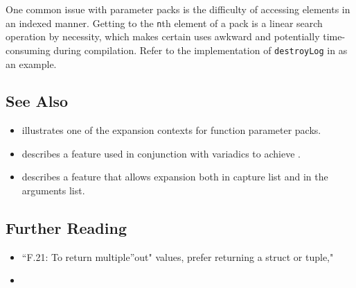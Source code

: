 One common issue with parameter packs is the difficulty of accessing
elements in an indexed manner. Getting to the \lstinline!n!th element of a
pack is a linear search operation by necessity, which makes certain uses
awkward and potentially time-consuming during compilation. Refer to the
implementation of \lstinline!destroyLog! in  as an example.

\subsection[See Also]{See Also}\label{see-also}

\begin{itemize}
\item{ illustrates one of the expansion contexts for function parameter packs.}
\item{ describes a feature used in conjunction with variadics to achieve .}
\item{ describes a feature that allows expansion both in capture list and in the arguments list.}
\end{itemize}

\subsection[Further Reading]{Further Reading}\label{further-reading}

\begin{itemize}
\item{``F.21: To return multiple''out" values, prefer returning a struct or tuple," \cite{stroustrup20}}
\item{\cite{vandevoorde18}}
\end{itemize}


